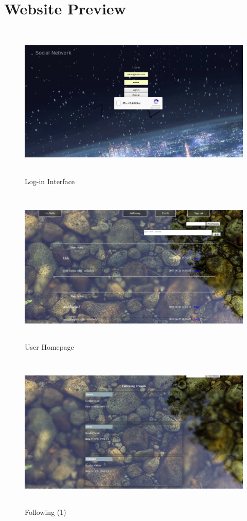 \section{Website Preview}
\begin{figure}[!htbp]
	\begin{center}
		\includegraphics[width=14cm,height=7.5cm]{p1.png}
		\caption{Log-in Interface}
	\end{center}
\end{figure}
\begin{figure}[!htbp]
	\begin{center}
		\includegraphics[width=14cm,height=7.5cm]{p2.png}
		\caption{User Homepage}
	\end{center}
\end{figure}
\begin{figure}[!htbp]
	\begin{center}
		\includegraphics[width=14cm,height=7.5cm]{p3.png}
		\caption{Following (1)}
	\end{center}
\end{figure}
